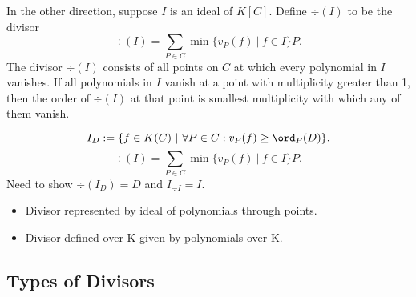In the other direction, suppose $I$ is an ideal of $K[C]$.
Define $\div(I)$ to be the divisor
  \[ \div(I) = \sum_{P \in C} \min\{ v_P(f) ~|~ f \in I \}P. \]
The divisor $\div(I)$ consists of all points on $C$ at which every polynomial in $I$ vanishes.
If all polynomials in $I$ vanish at a point with multiplicity greater than 1,
then the order of $\div(I)$ at that point is smallest multiplicity with which any of them vanish.

  \[ I_D := \{ f \in K(C) ~|~ \forall P \in C : v_P(f) \geq \ord_P(D) \}. \]
  \[ \div(I) = \sum_{P \in C} \min\{ v_P(f) ~|~ f \in I \}P. \]
Need to show $\div(I_D) = D$ and $I_{\div I} = I$.

\begin{itemize}
  \item Divisor represented by ideal of polynomials through points.
  \item Divisor defined over K given by polynomials over K.
\end{itemize}




\subsection{Types of Divisors}

